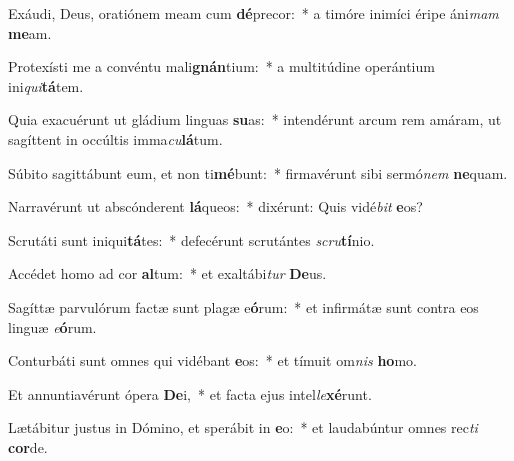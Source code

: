 \item Exáudi, Deus, oratiónem meam cum \textbf{dé}precor:~* a timóre inimíci éripe áni\textit{mam} \textbf{me}am.
\item Protexísti me a convéntu mali\textbf{gnán}tium:~* a multitúdine operántium ini\textit{qui}\textbf{tá}tem.
\item Quia exacuérunt ut gládium linguas \textbf{su}as:~* intendérunt arcum rem amáram, ut sagíttent in occúltis imma\textit{cu}\textbf{lá}tum.
\item Súbito sagittábunt eum, et non ti\textbf{mé}bunt:~* firmavérunt sibi sermó\textit{nem} \textbf{ne}quam.
\item Narravérunt ut abscónderent \textbf{lá}queos:~* dixérunt: Quis vidé\textit{bit} \textbf{e}os?
\item Scrutáti sunt iniqui\textbf{tá}tes:~* defecérunt scrutántes \textit{scru}\textbf{tí}nio.
\item Accédet homo ad cor \textbf{al}tum:~* et exaltábi\textit{tur} \textbf{De}us.
\item Sagíttæ parvulórum factæ sunt plagæ e\textbf{ó}rum:~* et infirmátæ sunt contra eos linguæ \textit{e}\textbf{ó}rum.
\item Conturbáti sunt omnes qui vidébant \textbf{e}os:~* et tímuit om\textit{nis} \textbf{ho}mo.
\item Et annuntiavérunt ópera \textbf{De}i,~* et facta ejus intel\textit{le}\textbf{xé}runt.
\item Lætábitur justus in Dómino, et sperábit in \textbf{e}o:~* et laudabúntur omnes rec\textit{ti} \textbf{cor}de.

